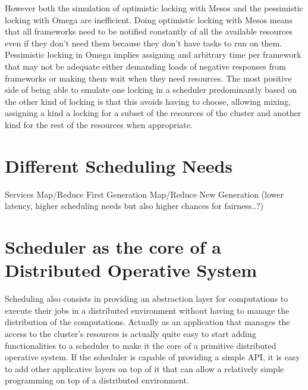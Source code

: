 \documentclass{svjour3}                     %
\begin{document}
However both the simulation of optimistic locking with Mesos and the
pessimistic locking with Omega are inefficient. Doing optimistic
locking with Mesos means that all frameworks need to be notified
constantly of all the available resources even if they don't need them
because they don't have tasks to run on them. Pessimistic locking in
Omega implies assigning and arbitrary time per framework that may not
be adequate either demanding loads of negative responses from
frameworks or making them wait when they need resources. The most positive
side of being able to emulate one locking in a scheduler predominantly
based on the other kind of locking is that this avoids having to
choose, allowing mixing, assigning a kind a locking for a subset of
the resources of the cluster and another kind for the rest of the
resources when appropriate.





\section{Different Scheduling Needs}

Services
Map/Reduce First Generation
Map/Reduce New Generation (lower latency, higher scheduling needs but also higher
chances for fairness..?)


\section{Scheduler as the core of a Distributed Operative System}

Scheduling also consists in providing an abstraction layer for
computations to execute their jobs in a distributed environment
without having to manage the distribution of the
computations. Actually as an application that manages the access to
the cluster's resources is actually quite easy to start adding
functionalities to a scheduler to make it the core of a primitive
distributed operative system. If the scheduler is capable of providing
a simple API, it is easy to add other applicative layers on top of
it that can allow a relatively simple programming on top of a
distributed environment.
\end{document}
